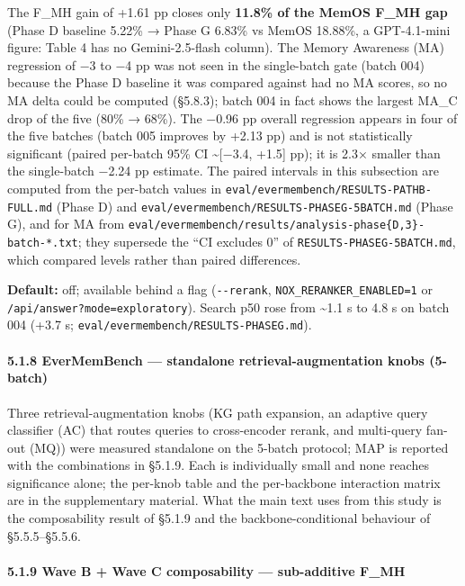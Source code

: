 \documentclass[
]{article}
\newcounter{none} %
\begin{document}
The F\_MH gain of +1.61 pp closes only \textbf{11.8\% of the MemOS F\_MH
gap} (Phase D baseline 5.22\% → Phase G 6.83\% vs MemOS 18.88\%, a
GPT-4.1-mini figure: Table 4 has no Gemini-2.5-flash column). The Memory
Awareness (MA) regression of −3 to −4 pp was not seen in the
single-batch gate (batch 004) because the Phase D baseline it was
compared against had no MA scores, so no MA delta could be computed
(§5.8.3); batch 004 in fact shows the largest MA\_C drop of the five
(80\% → 68\%). The −0.96 pp overall regression appears in four of the
five batches (batch 005 improves by +2.13 pp) and is not statistically
significant (paired per-batch 95\% CI \textasciitilde{[}−3.4, +1.5{]}
pp); it is 2.3× smaller than the single-batch −2.24 pp estimate. The
paired intervals in this subsection are computed from the per-batch
values in \texttt{eval/evermembench/RESULTS-PATHB-FULL.md} (Phase D) and
\texttt{eval/evermembench/RESULTS-PHASEG-5BATCH.md} (Phase G), and for
MA from
\texttt{eval/evermembench/results/analysis-phase\{D,3\}-batch-*.txt};
they supersede the ``CI excludes 0'' of
\texttt{RESULTS-PHASEG-5BATCH.md}, which compared levels rather than
paired differences.

\textbf{Default:} off; available behind a flag (\texttt{-\/-rerank},
\texttt{NOX\_RERANKER\_ENABLED=1} or
\texttt{/api/answer?mode=exploratory}). Search p50 rose from
\textasciitilde1.1 s to 4.8 s on batch 004 (+3.7 s;
\texttt{eval/evermembench/RESULTS-PHASEG.md}).

\paragraph{5.1.8 EverMemBench --- standalone retrieval-augmentation
knobs
(5-batch)}\label{evermembench-standalone-retrieval-augmentation-knobs-5-batch}

Three retrieval-augmentation knobs (KG path expansion, an adaptive query
classifier (AC) that routes queries to cross-encoder rerank, and
multi-query fan-out (MQ)) were measured standalone on the 5-batch
protocol; MAP is reported with the combinations in §5.1.9. Each is
individually small and none reaches significance alone; the per-knob
table and the per-backbone interaction matrix are in the supplementary
material. What the main text uses from this study is the composability
result of §5.1.9 and the backbone-conditional behaviour of
§5.5.5--§5.5.6.

\paragraph{5.1.9 Wave B + Wave C composability --- sub-additive
F\_MH}\label{wave-b-wave-c-composability-sub-additive-f_mh}
\end{document}
